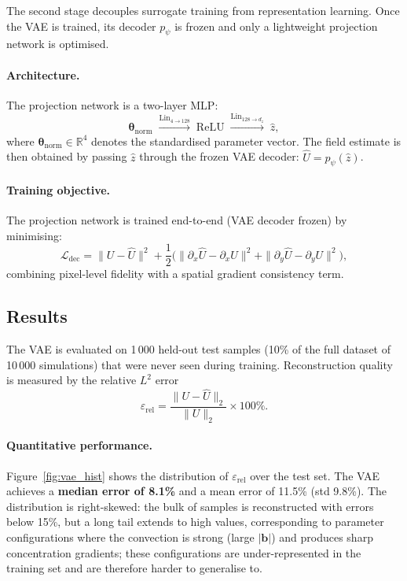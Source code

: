 \documentclass[a4paper]{article}
\newcommand{\vtheta}{\bm{\theta}}
\newcommand{\R}{\mathbb{R}}
\begin{document}
The second stage decouples surrogate training from representation learning. Once the VAE is trained, its decoder $p_\psi$ is frozen and only a lightweight projection network is optimised.

\paragraph{Architecture.}
The projection network is a two-layer MLP:
\[
    \vtheta_{\mathrm{norm}} \;\xrightarrow{\mathrm{Lin}_{4\to128}}\; \mathrm{ReLU} \;\xrightarrow{\mathrm{Lin}_{128\to d_z}}\; \hat{z},
\]
where $\vtheta_{\mathrm{norm}} \in \R^4$ denotes the standardised parameter vector. The field estimate is then obtained by passing $\hat{z}$ through the frozen VAE decoder: $\hat{U} = p_\psi(\hat{z})$.

\paragraph{Training objective.}
The projection network is trained end-to-end (VAE decoder frozen) by minimising:
\begin{equation}
    \mathcal{L}_{\mathrm{dec}} = \|U - \hat{U}\|^2 + \frac{1}{2}\bigl(\|\partial_x\hat{U} - \partial_x U\|^2 + \|\partial_y\hat{U} - \partial_y U\|^2\bigr),
    \label{eq:dec_loss}
\end{equation}
combining pixel-level fidelity with a spatial gradient consistency term.

\subsection{Results}

The VAE is evaluated on 1\,000 held-out test samples (10\% of the full dataset of 10\,000 simulations) that were never seen during training. Reconstruction quality is measured by the relative $L^2$ error
\[
    \varepsilon_{\mathrm{rel}} = \frac{\|U - \hat{U}\|_2}{\|U\|_2} \times 100\%.
\]

\paragraph{Quantitative performance.}
Figure~\ref{fig:vae_hist} shows the distribution of $\varepsilon_{\mathrm{rel}}$ over the test set. The VAE achieves a \textbf{median error of 8.1\%} and a mean error of 11.5\% (std 9.8\%). The distribution is right-skewed: the bulk of samples is reconstructed with errors below 15\%, but a long tail extends to high values, corresponding to parameter configurations where the convection is strong (large $|\bm{b}|$) and produces sharp concentration gradients; these configurations are under-represented in the training set and are therefore harder to generalise to.
\end{document}
